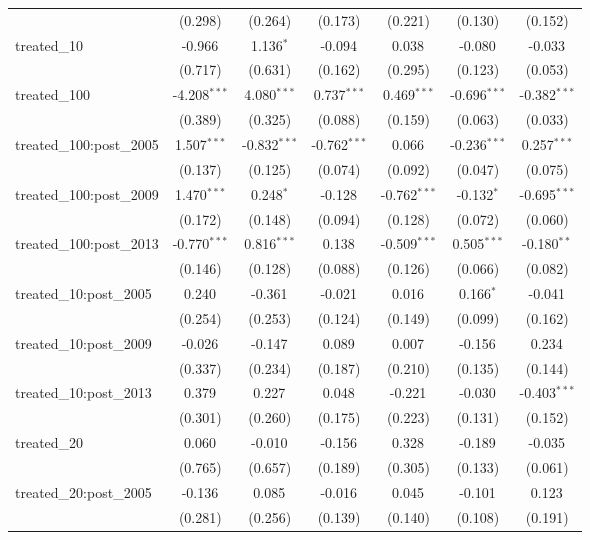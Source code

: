 \begin{table}[!htbp]
\begin{tabular}{@{\extracolsep{5pt}}lcccccc}
  & (0.298) & (0.264) & (0.173) & (0.221) & (0.130) & (0.152) \\
 treated_10 & -0.966$^{}$ & 1.136$^{*}$ & -0.094$^{}$ & 0.038$^{}$ & -0.080$^{}$ & -0.033$^{}$ \\
  & (0.717) & (0.631) & (0.162) & (0.295) & (0.123) & (0.053) \\
 treated_100 & -4.208$^{***}$ & 4.080$^{***}$ & 0.737$^{***}$ & 0.469$^{***}$ & -0.696$^{***}$ & -0.382$^{***}$ \\
  & (0.389) & (0.325) & (0.088) & (0.159) & (0.063) & (0.033) \\
 treated_100:post_2005 & 1.507$^{***}$ & -0.832$^{***}$ & -0.762$^{***}$ & 0.066$^{}$ & -0.236$^{***}$ & 0.257$^{***}$ \\
  & (0.137) & (0.125) & (0.074) & (0.092) & (0.047) & (0.075) \\
 treated_100:post_2009 & 1.470$^{***}$ & 0.248$^{*}$ & -0.128$^{}$ & -0.762$^{***}$ & -0.132$^{*}$ & -0.695$^{***}$ \\
  & (0.172) & (0.148) & (0.094) & (0.128) & (0.072) & (0.060) \\
 treated_100:post_2013 & -0.770$^{***}$ & 0.816$^{***}$ & 0.138$^{}$ & -0.509$^{***}$ & 0.505$^{***}$ & -0.180$^{**}$ \\
  & (0.146) & (0.128) & (0.088) & (0.126) & (0.066) & (0.082) \\
 treated_10:post_2005 & 0.240$^{}$ & -0.361$^{}$ & -0.021$^{}$ & 0.016$^{}$ & 0.166$^{*}$ & -0.041$^{}$ \\
  & (0.254) & (0.253) & (0.124) & (0.149) & (0.099) & (0.162) \\
 treated_10:post_2009 & -0.026$^{}$ & -0.147$^{}$ & 0.089$^{}$ & 0.007$^{}$ & -0.156$^{}$ & 0.234$^{}$ \\
  & (0.337) & (0.234) & (0.187) & (0.210) & (0.135) & (0.144) \\
 treated_10:post_2013 & 0.379$^{}$ & 0.227$^{}$ & 0.048$^{}$ & -0.221$^{}$ & -0.030$^{}$ & -0.403$^{***}$ \\
  & (0.301) & (0.260) & (0.175) & (0.223) & (0.131) & (0.152) \\
 treated_20 & 0.060$^{}$ & -0.010$^{}$ & -0.156$^{}$ & 0.328$^{}$ & -0.189$^{}$ & -0.035$^{}$ \\
  & (0.765) & (0.657) & (0.189) & (0.305) & (0.133) & (0.061) \\
 treated_20:post_2005 & -0.136$^{}$ & 0.085$^{}$ & -0.016$^{}$ & 0.045$^{}$ & -0.101$^{}$ & 0.123$^{}$ \\
  & (0.281) & (0.256) & (0.139) & (0.140) & (0.108) & (0.191) \\

\end{tabular}
\end{table}
